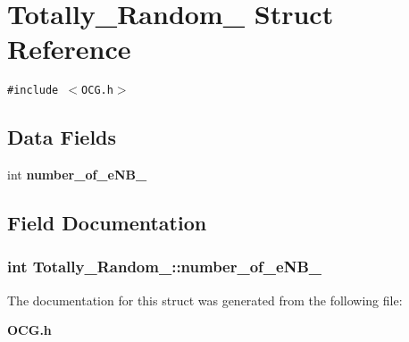 \section{Totally\_\-Random\_\- Struct Reference}
\label{structTotally__Random__}
{\tt \#include $<$OCG.h$>$}

\subsection*{Data Fields}
\begin{CompactItemize}
\item 
int {\bf number\_\-of\_\-eNB\_\-}
\end{CompactItemize}


\subsection{Field Documentation}
\subsubsection[{number\_\-of\_\-eNB\_\-}]{\setlength{\rightskip}{0pt plus 5cm}int {\bf Totally\_\-Random\_\-::number\_\-of\_\-eNB\_\-}}\label{structTotally__Random___350970a3c0f0e72b01f6c6336cc5f66c}




The documentation for this struct was generated from the following file:\begin{CompactItemize}
\item 
{\bf OCG.h}\end{CompactItemize}
